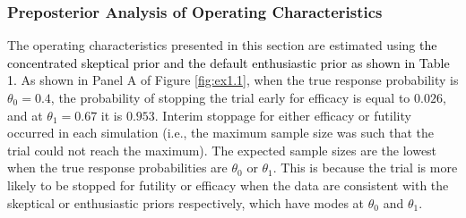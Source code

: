 \documentclass[12pt]{article}
\begin{document}
\subsubsection{Preposterior Analysis of Operating Characteristics}\label{sec:ex1.1}
The operating characteristics presented in this section are estimated using \textcolor{black}{the concentrated skeptical prior and the default enthusiastic prior as shown in Table 1.}
%
As shown in Panel A of Figure \ref{fig:ex1.1}, when the true response probability is $\theta_0=0.4$, the probability of stopping the trial early for efficacy is equal to $0.026$, and at $\theta_1=0.67$ it is $0.953$. 
%
Interim stoppage for either efficacy or futility occurred in each simulation (i.e., the maximum sample size was such that the trial could not reach the maximum). The expected sample sizes are the lowest when the true response probabilities are $\theta_0$ or $\theta_1$. This is because the trial is more likely to be stopped for futility or efficacy when the data are consistent with the skeptical or enthusiastic priors respectively, which have modes at $\theta_0$ and $\theta_1$. 
%
%
%
%
\end{document}
